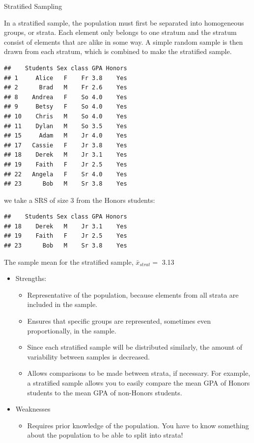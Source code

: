 \documentclass[]{book}
\providecommand{\tightlist}{%
  \setlength{\itemsep}{0pt}\setlength{\parskip}{0pt}}
\begin{document}
Stratified Sampling

In a stratified sample, the population must first be separated into homogeneous groups, or strata. Each element only belongs to one stratum and the stratum consist of elements that are alike in some way. A simple random sample is then drawn from each stratum, which is combined to make the stratified sample.

\begin{verbatim}
##    Students Sex class GPA Honors
## 1     Alice   F    Fr 3.8    Yes
## 2      Brad   M    Fr 2.6    Yes
## 8    Andrea   F    So 4.0    Yes
## 9     Betsy   F    So 4.0    Yes
## 10    Chris   M    So 4.0    Yes
## 11    Dylan   M    So 3.5    Yes
## 15     Adam   M    Jr 4.0    Yes
## 17   Cassie   F    Jr 3.8    Yes
## 18    Derek   M    Jr 3.1    Yes
## 19    Faith   F    Jr 2.5    Yes
## 22   Angela   F    Sr 4.0    Yes
## 23      Bob   M    Sr 3.8    Yes
\end{verbatim}

we take a SRS of size 3 from the Honors students:

\begin{verbatim}
##    Students Sex class GPA Honors
## 18    Derek   M    Jr 3.1    Yes
## 19    Faith   F    Jr 2.5    Yes
## 23      Bob   M    Sr 3.8    Yes
\end{verbatim}

The sample mean for the stratified sample, \(\bar{x}_{strat}=\) 3.13

\begin{itemize}
\tightlist
\item
  Strengths:

  \begin{itemize}
  \tightlist
  \item
    Representative of the population, because elements from all strata are included in the sample.
  \item
    Ensures that specific groups are represented, sometimes even proportionally, in the sample.
  \item
    Since each stratified sample will be distributed similarly, the amount of variability between samples is decreased.
  \item
    Allows comparisons to be made between strata, if necessary. For example, a stratified sample allows you to easily compare the mean GPA of Honors students to the mean GPA of non-Honors students.
  \end{itemize}
\item
  Weaknesses

  \begin{itemize}
  \tightlist
  \item
    Requires prior knowledge of the population. You have to know something about the population to be able to split into strata!
  \end{itemize}
\end{itemize}
\end{document}
